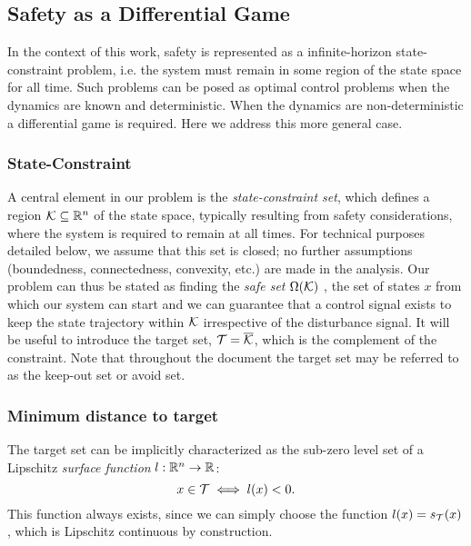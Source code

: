 \documentclass[letterpaper, 10 pt, conference]{ieeeconf}
\begin{document}
\subsection{Safety as a Differential Game}\label{subsec:formulation_constraints}
In the context of this work, safety is represented as a infinite-horizon state-constraint problem, i.e. the system must remain in some region of the state space for all time. Such problems can be posed as optimal control problems when the dynamics are known and deterministic. When the dynamics are non-deterministic a differential game is required. Here we address this more general case. 

\subsubsection{State-Constraint}
A central element in our problem is the \emph{state-constraint set}, which defines a region $\mathcal{K}\subseteq \mathbb{R}^n$ of the state space, typically resulting from safety considerations, where the system is required to remain at all times. For technical purposes detailed below, we assume that this set is closed; no further assumptions (boundedness, connectedness, convexity, etc.) are made in the analysis. Our problem can thus be stated as finding the \emph{safe set} $\Omega(\mathcal{K})$ , the set of states $x$ from which our system can start and we can guarantee that a control signal exists to keep the state trajectory within $\mathcal{K}$ irrespective of the disturbance signal. It will be useful to introduce the target set, $\mathcal{T}=\overline{\mathcal{K}}$, which is the complement of the constraint. Note that throughout the document the target set may be referred to as the keep-out set or avoid set. 

\subsubsection{Minimum distance to target}
The target set can be implicitly characterized as the sub-zero level set of a Lipschitz \emph{surface function} $l:\mathbb{R}^n\rightarrow\mathbb{R}$: 
\begin{equation}\label{eq:l}
x\in\mathcal{T}\iff l(x)<0.
\end{equation}
This function always exists, since we can simply choose the function $l(x) = s_{\mathcal{T}}(x)$, 
which is Lipschitz continuous by construction. 
\end{document}
